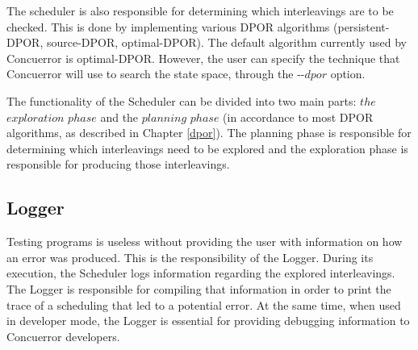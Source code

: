 The scheduler is also responsible for determining which interleavings are to be checked. This is done
by implementing various DPOR algorithms (persistent-DPOR, source-DPOR, optimal-DPOR). The default
algorithm currently used by Concuerror is optimal-DPOR. 
However, the user can specify the technique that Concuerror will use to search the state space, through the -{}-$dpor$ option.

The functionality of the Scheduler can be divided into two main parts: $the$ $exploration$ $phase$ and
the $planning$ $phase$ (in accordance to most DPOR algorithms, as described in Chapter \ref{dpor}).
The planning phase is responsible for determining which interleavings need to be explored and the
exploration phase is responsible for producing those interleavings.

\subsection{Logger}

Testing programs is useless without providing the user with information on how an error was produced. This is
the responsibility of the Logger. During its execution, the Scheduler logs information regarding the explored interleavings. 
The Logger is responsible for compiling that information in order to print the trace of a scheduling that led to a
potential error. At the same time, when used in developer mode, the Logger is essential for providing debugging 
information to Concuerror developers.
